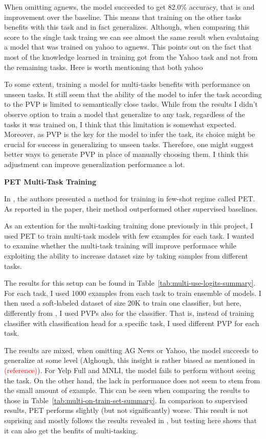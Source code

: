 \documentclass[11pt,a4paper]{article}
\newcommand\todo[1]{\textcolor{red}{#1}}
\begin{document}
When omitting agnews, the model succeeded to get 82.0\% accuracy, that is and improvement over the baseline.
This means that training on the other tasks benefits with this task and in fact generalizes.
Although, when comparing this score to the single task traing we can see almost the same result when evalutaing a model that was trained on yahoo to agnews.
This points out on the fact that most of the knowledge learned in training got from the Yahoo task and not from the remaining tasks.
Here is worth mentioning that both yahoo

To some extent, training a model for multi-tasks benefits with performance on unseen tasks.
It still seem that the ability of the model to infer the task according to the PVP is limited to semantically close tasks.
While from the results I didn't observe option to train a model that generalize to any task, regardless of the tasks it was trained on, I think that this limitation is somewhat expected.
Moreover, as PVP is the key for the model to infer the task, its choice might be crucial for success in generalizing to unseen tasks.
Therefore, one might suggest better ways to generate PVP in place of manually choosing them.
I think this adjustment can improve generalization performance a lot.


\vspace{8pt}
\noindent\textbf{PET Multi-Task Training}\quad

In \citet{schick2020exploiting}, the authors presented a method for training in few-shot regime called PET.
As reported in the paper, their method outperformed other supervised baselines.

As an extention for the multi-tasking training done previously in this project, I used PET to train multi-task models with few examples for each task.
I wanted to examine whether the multi-task training will improve performace while exploiting the ability to increase dataset size by taking samples from different tasks.

The results for this setup can be found in Table~\ref{tab:multi-use-logits-summary}.
For each task, I used 1000 examples from each task to train ensemble of models.
I then used a soft-labeled dataset of size 20K to train one classifier, but here, differently from \citet{schick2020exploiting}, I used PVPs also for the classifier.
That is, instead of training classifier with classification head for a specific task, I used different PVP for each task.

The results are mixed, when omitting AG News or Yahoo, the model succeeds to generalize at some level (Alghough, this insight is rather biased as mentioned in \todo{(reference)}).
For Yelp Full and MNLI, the model fails to perform without seeing the task.
On the other hand, the lack in performance does not seem to stem from the small amount of example.
This can be seen when comparing the results to those in Table~\ref{tab:multi-on-train-set-summary}.
In comparison to supervised results, PET performs slightly (but not significantly) worse.
This result is not suprising and mostly follows the results revealed in \citet{schick2020exploiting}, but testing here shows that it can also get the benfits of multi-tasking.
\end{document}
